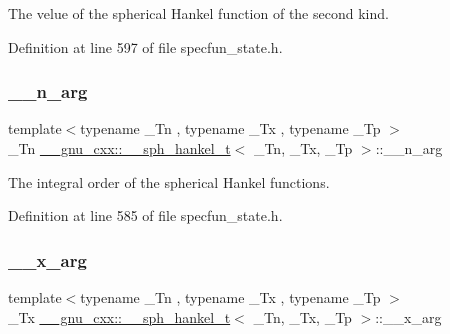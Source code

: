 The velue of the spherical Hankel function of the second kind. 



Definition at line 597 of file specfun\+\_\+state.\+h.

\mbox{\label{struct____gnu__cxx_1_1____sph__hankel__t_a43f671e87375a9077262676564df20c5}} 
\subsubsection{\texorpdfstring{\+\_\+\+\_\+n\+\_\+arg}{\_\_n\_arg}}
{\footnotesize\ttfamily template$<$typename \+\_\+\+Tn , typename \+\_\+\+Tx , typename \+\_\+\+Tp $>$ \\
\+\_\+\+Tn \hyperlink{struct____gnu__cxx_1_1____sph__hankel__t}{\+\_\+\+\_\+gnu\+\_\+cxx\+::\+\_\+\+\_\+sph\+\_\+hankel\+\_\+t}$<$ \+\_\+\+Tn, \+\_\+\+Tx, \+\_\+\+Tp $>$\+::\+\_\+\+\_\+n\+\_\+arg}



The integral order of the spherical Hankel functions. 



Definition at line 585 of file specfun\+\_\+state.\+h.

\mbox{\label{struct____gnu__cxx_1_1____sph__hankel__t_a265ee0cdcca2d491c29b520a0fd4e4b3}} 
\subsubsection{\texorpdfstring{\+\_\+\+\_\+x\+\_\+arg}{\_\_x\_arg}}
{\footnotesize\ttfamily template$<$typename \+\_\+\+Tn , typename \+\_\+\+Tx , typename \+\_\+\+Tp $>$ \\
\+\_\+\+Tx \hyperlink{struct____gnu__cxx_1_1____sph__hankel__t}{\+\_\+\+\_\+gnu\+\_\+cxx\+::\+\_\+\+\_\+sph\+\_\+hankel\+\_\+t}$<$ \+\_\+\+Tn, \+\_\+\+Tx, \+\_\+\+Tp $>$\+::\+\_\+\+\_\+x\+\_\+arg}



